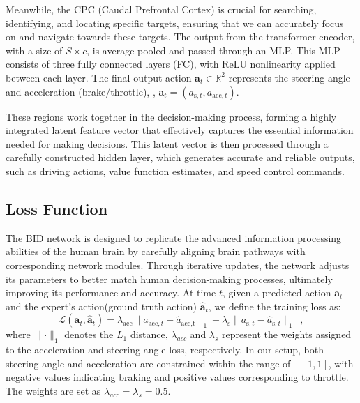 Meanwhile, the CPC (Caudal Prefrontal Cortex) is crucial for searching, identifying, and locating specific targets, ensuring that we can accurately focus on and navigate towards these targets.  
The output from the transformer encoder, with a size of $S\times c$, is average-pooled and passed through an MLP.
This MLP consists of three fully connected layers (FC), with ReLU nonlinearity applied between each layer.
The final output action $\mathbf{a}_t\in\mathbb{R}^2$ represents the steering angle and acceleration (brake/throttle), {\ie}, $\mathbf{a}_{t} = (a_{\text{s},t}, a_{\text{acc}, t})$. 


These regions work together in the decision-making process, forming a highly integrated latent feature vector that effectively captures the essential information needed for making decisions. 
This latent vector is then processed through a carefully constructed hidden layer, which generates accurate and reliable outputs, such as driving actions, value function estimates, and speed control commands.


\subsection{Loss Function}

\hspace{1pc}The BID network is designed to replicate the advanced information processing abilities of the human brain by carefully aligning brain pathways with corresponding network modules. 
Through iterative updates, the network adjusts its parameters to better match human decision-making processes, ultimately improving its performance and accuracy.
%
At time $t$, given a predicted action $\mathbf{a}_{t}$ and the expert's action(ground truth action) $\hat{\mathbf{a}}_{t}$, we define the training loss as:
\begin{equation}\label{eq:loss}
	\mathcal{L}(\mathbf{a}_t, \hat{\mathbf{a}}_t) = \lambda_{\text{acc}}\lVert a_{\text{acc},t}-\hat{a}_{\text{acc,t}}\rVert_{1} + \lambda_{\text{s}} \lVert a_{\text{s},t}-\hat{a}_{\text{s},t} \rVert_{1} \enspace ,
\end{equation}
where $\lVert\cdot\rVert_{1}$ denotes the $L_1$ distance, $\lambda_{acc}$ and $\lambda_s$ represent the weights assigned to the acceleration and steering angle loss, respectively.
In our setup, both steering angle and acceleration are constrained within the range of $[-1, 1]$, with negative values indicating braking and positive values corresponding to throttle.
The weights are set as $\lambda_{acc} = \lambda_{s} = 0.5$. 


